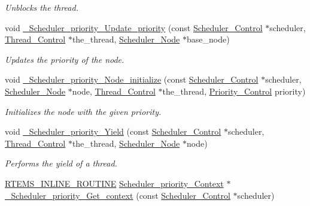\begin{DoxyCompactItemize}
\begin{DoxyCompactList}\small\item\em Unblocks the thread. \end{DoxyCompactList}\item 
void \mbox{\hyperlink{group__RTEMSScoreSchedulerDPS_gaa9250624cb136b5fd42bdfe060a2eb5e}{\+\_\+\+Scheduler\+\_\+priority\+\_\+\+Update\+\_\+priority}} (const \mbox{\hyperlink{struct__Scheduler__Control}{Scheduler\+\_\+\+Control}} $\ast$scheduler, \mbox{\hyperlink{struct__Thread__Control}{Thread\+\_\+\+Control}} $\ast$the\+\_\+thread, \mbox{\hyperlink{structScheduler__Node}{Scheduler\+\_\+\+Node}} $\ast$base\+\_\+node)
\begin{DoxyCompactList}\small\item\em Updates the priority of the node. \end{DoxyCompactList}\item 
void \mbox{\hyperlink{group__RTEMSScoreSchedulerDPS_ga068b274fb5ddb43859266d6bcfadb060}{\+\_\+\+Scheduler\+\_\+priority\+\_\+\+Node\+\_\+initialize}} (const \mbox{\hyperlink{struct__Scheduler__Control}{Scheduler\+\_\+\+Control}} $\ast$scheduler, \mbox{\hyperlink{structScheduler__Node}{Scheduler\+\_\+\+Node}} $\ast$node, \mbox{\hyperlink{struct__Thread__Control}{Thread\+\_\+\+Control}} $\ast$the\+\_\+thread, \mbox{\hyperlink{group__RTEMSScorePriority_ga59d02b58072d31a9a1cfe644557aefe2}{Priority\+\_\+\+Control}} priority)
\begin{DoxyCompactList}\small\item\em Initializes the node with the given priority. \end{DoxyCompactList}\item 
void \mbox{\hyperlink{group__RTEMSScoreSchedulerDPS_ga5a3959d17cc9aa59b20ef5622e5de88f}{\+\_\+\+Scheduler\+\_\+priority\+\_\+\+Yield}} (const \mbox{\hyperlink{struct__Scheduler__Control}{Scheduler\+\_\+\+Control}} $\ast$scheduler, \mbox{\hyperlink{struct__Thread__Control}{Thread\+\_\+\+Control}} $\ast$the\+\_\+thread, \mbox{\hyperlink{structScheduler__Node}{Scheduler\+\_\+\+Node}} $\ast$node)
\begin{DoxyCompactList}\small\item\em Performs the yield of a thread. \end{DoxyCompactList}\item 
\mbox{\hyperlink{group__RTEMSScoreBaseDefs_gac216239df231d5dbd15e3520b0b9313f}{R\+T\+E\+M\+S\+\_\+\+I\+N\+L\+I\+N\+E\+\_\+\+R\+O\+U\+T\+I\+NE}} \mbox{\hyperlink{structScheduler__priority__Context}{Scheduler\+\_\+priority\+\_\+\+Context}} $\ast$ \mbox{\hyperlink{group__RTEMSScoreSchedulerDPS_ga8a69246c562c36bec9bf7047be7d50ae}{\+\_\+\+Scheduler\+\_\+priority\+\_\+\+Get\+\_\+context}} (const \mbox{\hyperlink{struct__Scheduler__Control}{Scheduler\+\_\+\+Control}} $\ast$scheduler)

\end{DoxyCompactItemize}
